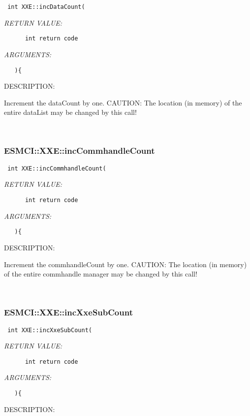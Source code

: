   
\begin{verbatim} int XXE::incDataCount(\end{verbatim}{\em RETURN VALUE:}
\begin{verbatim}      int return code\end{verbatim}{\em ARGUMENTS:}
\begin{verbatim}   ){\end{verbatim}
{\sf DESCRIPTION:\\ }


    Increment the dataCount by one.
    CAUTION: The location (in memory) of the entire dataList may be changed by
             this call! 
 
\mbox{}\hrulefill\
 
\subsubsection [ESMCI::XXE::incCommhandleCount] {ESMCI::XXE::incCommhandleCount}


  
\begin{verbatim} int XXE::incCommhandleCount(\end{verbatim}{\em RETURN VALUE:}
\begin{verbatim}      int return code\end{verbatim}{\em ARGUMENTS:}
\begin{verbatim}   ){\end{verbatim}
{\sf DESCRIPTION:\\ }


    Increment the commhandleCount by one.
    CAUTION: The location (in memory) of the entire commhandle manager may be
             changed by this call! 
 
\mbox{}\hrulefill\
 
\subsubsection [ESMCI::XXE::incXxeSubCount] {ESMCI::XXE::incXxeSubCount}


  
\begin{verbatim} int XXE::incXxeSubCount(\end{verbatim}{\em RETURN VALUE:}
\begin{verbatim}      int return code\end{verbatim}{\em ARGUMENTS:}
\begin{verbatim}   ){\end{verbatim}
{\sf DESCRIPTION:\\ }


